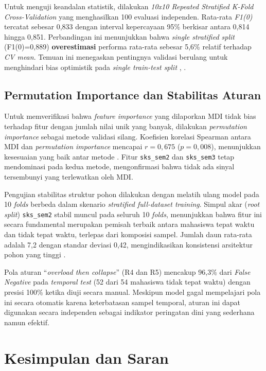 \documentclass{ieeeaccess}
\begin{document}
Untuk menguji keandalan statistik, dilakukan \emph{10x10 Repeated Stratified K-Fold Cross-Validation} yang menghasilkan 100 evaluasi independen. Rata-rata \emph{F1(0)} tercatat sebesar 0,833 dengan interval kepercayaan 95\% berkisar antara 0,814 hingga 0,851. Perbandingan ini menunjukkan bahwa \emph{single stratified split} (F1(0)=0,889) \textbf{overestimasi} performa rata-rata sebesar 5,6\% relatif terhadap \emph{CV mean}. Temuan ini menegaskan pentingnya validasi berulang untuk menghindari bias optimistik pada \emph{single train-test split} \cite{ref28}, \cite{ref29}.

\subsection{Permutation Importance dan Stabilitas Aturan}

Untuk memverifikasi bahwa \emph{feature importance} yang dilaporkan MDI tidak bias terhadap fitur dengan jumlah nilai unik yang banyak, dilakukan \emph{permutation importance} sebagai metode validasi silang. Koefisien korelasi Spearman antara MDI dan \emph{permutation importance} mencapai $r = 0,675$ ($p = 0,008$), menunjukkan kesesuaian yang baik antar metode \cite{ref11}. Fitur \texttt{sks\_sem2} dan \texttt{sks\_sem3} tetap mendominasi pada kedua metode, mengonfirmasi bahwa tidak ada sinyal tersembunyi yang terlewatkan oleh MDI.

Pengujian stabilitas struktur pohon dilakukan dengan melatih ulang model pada 10 \emph{folds} berbeda dalam skenario \emph{stratified full-dataset training}. Simpul akar (\emph{root split}) \texttt{sks\_sem2} stabil muncul pada seluruh 10 \emph{folds}, menunjukkan bahwa fitur ini secara fundamental merupakan pemisah terbaik antara mahasiswa tepat waktu dan tidak tepat waktu, terlepas dari komposisi sampel. Jumlah daun rata-rata adalah 7,2 dengan standar deviasi 0,42, mengindikasikan konsistensi arsitektur pohon yang tinggi \cite{ref22}.

Pola aturan ``\emph{overload then collapse}'' (R4 dan R5) mencakup 96,3\% dari \emph{False Negative} pada \emph{temporal test} (52 dari 54 mahasiswa tidak tepat waktu) dengan presisi 100\% ketika diuji secara manual. Meskipun model gagal mempelajari pola ini secara otomatis karena keterbatasan sampel temporal, aturan ini dapat digunakan secara independen sebagai indikator peringatan dini yang sederhana namun efektif.

\section{Kesimpulan dan Saran}
\label{sec:conclusion}
\end{document}
